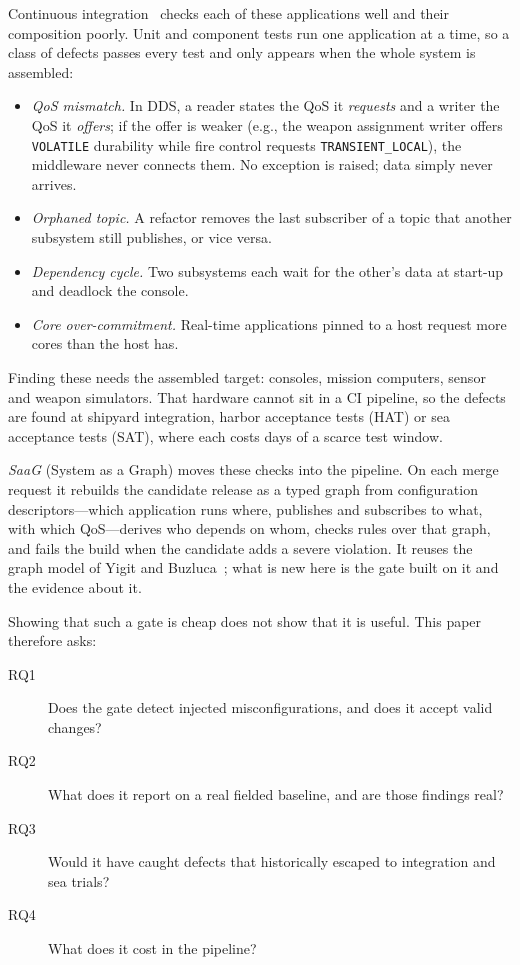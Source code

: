 \documentclass[sigconf,screen]{acmart}
\begin{document}
Continuous integration~\cite{humble2010} checks each of these applications well and their composition poorly. Unit and component tests run one application at a time, so a class of defects passes every test and only appears when the whole system is assembled:
\begin{itemize}
\item \emph{QoS mismatch.} In DDS, a reader states the QoS it \emph{requests} and a writer the QoS it \emph{offers}; if the offer is weaker (e.g., the weapon assignment writer offers \texttt{VOLATILE} durability while fire control requests \texttt{TRANSIENT\_LOCAL}), the middleware never connects them. No exception is raised; data simply never arrives.
\item \emph{Orphaned topic.} A refactor removes the last subscriber of a topic that another subsystem still publishes, or vice versa.
\item \emph{Dependency cycle.} Two subsystems each wait for the other's data at start-up and deadlock the console.
\item \emph{Core over-commitment.} Real-time applications pinned to a host request more cores than the host has.
\end{itemize}
Finding these needs the assembled target: consoles, mission computers, sensor and weapon simulators. That hardware cannot sit in a CI pipeline, so the defects are found at shipyard integration, harbor acceptance tests (HAT) or sea acceptance tests (SAT), where each costs days of a scarce test window.

\emph{SaaG} (System as a Graph) moves these checks into the pipeline. On each merge request it rebuilds the candidate release as a typed graph from configuration descriptors---which application runs where, publishes and subscribes to what, with which QoS---derives who depends on whom, checks rules over that graph, and fails the build when the candidate adds a severe violation. It reuses the graph model of Yigit and Buzluca~\cite{yigit2025graph}; what is new here is the gate built on it and the evidence about it.

Showing that such a gate is cheap does not show that it is useful. This paper therefore asks:
\begin{description}
\item[RQ1] Does the gate detect injected misconfigurations, and does it accept valid changes?
\item[RQ2] What does it report on a real fielded baseline, and are those findings real?
\item[RQ3] Would it have caught defects that historically escaped to integration and sea trials?
\item[RQ4] What does it cost in the pipeline?
\end{description}
\end{document}
